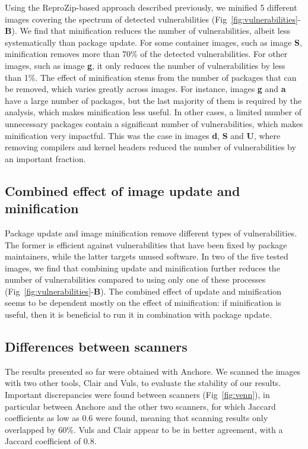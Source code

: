 \documentclass[a4paper,num-refs]{oup-contemporary}
\begin{document}
Using the ReproZip-based approach described previously, we minified 5
different images covering the spectrum of detected vulnerabilities
(Fig~\ref{fig:vulnerabilities}-\textbf{B}). We find that minification reduces the
number of vulnerabilities, albeit less systematically than package update.
For some container images, such as image \textbf{S}, minification removes more
than 70\% of the detected vulnerabilities. For other images, such as
image \textbf{g}, it only reduces the number of vulnerabilities by less than 1\%.
The effect of minification stems from the number of packages
that can be removed, which varies greatly across images. For
instance, images \textbf{g} and \textbf{a} have a large number of packages,
but the last majority of them is required by the analysis, which makes
minification less useful. In other cases, a limited number of unnecessary packages contain 
a significant number of vulnerabilities, which makes minification very impactful. 
This was the case in images \textbf{d}, \textbf{S} and \textbf{U}, where removing compilers
and kernel headers reduced the number of vulnerabilities by an important fraction. 

\subsection{Combined effect of image update and  minification}

Package update and image minification remove different types of
vulnerabilities. The former is efficient against vulnerabilities that have
been fixed by package maintainers, while the latter targets unused
software. In two of the five tested images, we find that combining update
and minification further reduces the number of vulnerabilities compared to
using only one of these processes
(Fig~\ref{fig:vulnerabilities}-\textbf{B}). The combined effect of update and
minification seems to be dependent mostly on the effect of minification: if
minification is useful, then it is beneficial to run it in combination with
package update.

\subsection{Differences between scanners}

The results presented so far were obtained with Anchore. We scanned the images with two other tools,
Clair and Vuls, to evaluate the stability of our results. Important
discrepancies were found between scanners (Fig~\ref{fig:venn}), in particular between Anchore
and the other two scanners, for which Jaccard coefficients as low as 0.6 were found, meaning
that scanning results only overlapped by 60\%. Vuls and Clair appear to be in better
agreement, with a Jaccard coefficient of 0.8.
\end{document}
